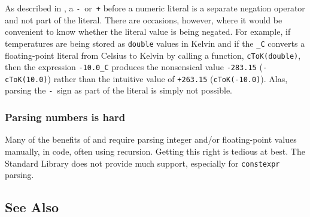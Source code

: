 As described in , a
\lstinline!-!~or~\lstinline!+! before a numeric literal is a separate negation
operator and not part of the literal. There are occasions, however,
where it would be convenient to know whether the literal value is being
negated. For example, if temperatures are being stored as
\lstinline!double! values in Kelvin and if the 
\lstinline!_C! converts a floating-point literal from Celsius to Kelvin by
calling a function, \lstinline!cToK(double)!, then the expression
\lstinline!-10.0_C! produces the nonsensical value \lstinline!-283.15!
(\lstinline!-cToK(10.0)!) rather than the intuitive value of \lstinline!+263.15!
(\lstinline!cToK(-10.0)!). Alas, parsing the
\lstinline!-!~sign as part of the literal is simply not possible.

\subsubsection[Parsing numbers is hard]{Parsing numbers is hard}\label{parsing-numbers-is-hard}

Many of the benefits of  and  require parsing integer and/or floating-point values
manually, in code, often using recursion. Getting this right is tedious
at best. The Standard Library does not provide much support, especially
for \lstinline!constexpr! parsing.



\subsection[See Also]{See Also}\label{see-also}

